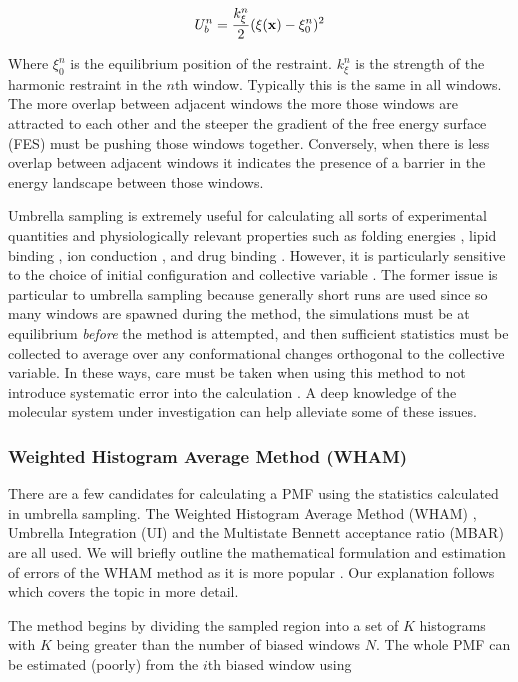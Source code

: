 \begin{equation}
	U_{b}^n = \frac{k^n_{\xi}}{2}(\xi(\bold{x}) - \xi_0^n)^2
	\label{umbrella_bias}
\end{equation}

Where $\xi_0^n$ is the equilibrium position of the restraint. $k_{\xi}^n$ is the strength of the harmonic restraint in the $n$th window. Typically this is the same in all windows. The more overlap between adjacent windows the more those windows are attracted to each other and the steeper the gradient of the free energy surface (FES) must be pushing those windows together. Conversely, when there is less overlap between adjacent windows it indicates the presence of a barrier in the energy landscape between those windows.

Umbrella sampling is extremely useful for calculating all sorts of experimental quantities and physiologically relevant properties such as folding energies \cite{meshkin2017}, lipid binding \cite{domanski2017}, ion conduction \cite{zhu2012b}, and drug binding \cite{subramanian2019}. However, it is particularly sensitive to the choice of initial configuration and collective variable \cite{domanski2017}. The former issue is particular to umbrella sampling because generally short runs are used since so many windows are spawned during the method, the simulations must be at equilibrium \textit{before} the method is attempted, and then sufficient statistics must be collected to average over any conformational changes orthogonal to the collective variable. In these ways, care must be taken when using this method to not introduce systematic error into the calculation \cite{you2019a}. A deep knowledge of the molecular system under investigation can help alleviate some of these issues. 

\subsubsection{Weighted Histogram Average Method (WHAM)}
There are a few candidates for calculating a PMF using the statistics calculated in umbrella sampling. The Weighted Histogram Average Method (WHAM) \cite{kumar1992}, Umbrella Integration (UI) \cite{kastner2005} and the Multistate Bennett acceptance ratio (MBAR) \cite{kim2012} are all used. We will briefly outline the mathematical formulation and estimation of errors of the WHAM method as it is more popular \cite{zhu2012}. Our explanation follows \cite{kastner2011} which covers the topic in more detail.

The method begins by dividing the sampled region into a set of $K$ histograms with $K$ being greater than the number of biased windows $N$.  The whole PMF can be estimated (poorly) from the $i$th biased window using 

